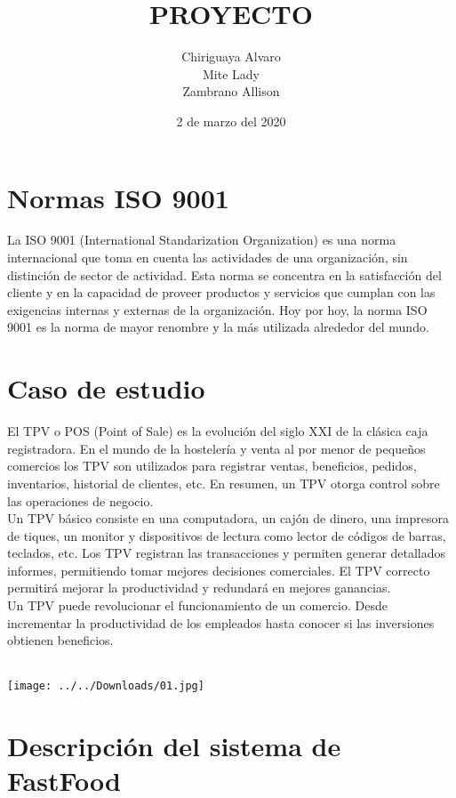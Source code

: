 \documentclass[12pt,a4paper]{article}
\title{PROYECTO}
\author{Chiriguaya Alvaro\\Mite Lady\\Zambrano Allison}
\date{2 de marzo del 2020}
\begin{document}
\maketitle

\section{Normas ISO 9001}
La ISO 9001 (International Standarization Organization) es una norma internacional que toma en cuenta las actividades de una organización, sin distinción de sector de actividad. Esta norma se concentra en la satisfacción del cliente y en la capacidad de proveer productos y servicios que cumplan con las exigencias internas y externas de la organización. Hoy por hoy, la norma ISO 9001 es la norma de mayor renombre y la más utilizada alrededor del mundo.

\section{Caso de estudio}
El TPV o POS (Point of Sale) es la evolución del siglo XXI de la clásica caja registradora. En el mundo de la hostelería y venta al por menor de pequeños comercios los TPV son utilizados para registrar ventas, beneficios, pedidos, inventarios, historial de clientes, etc. En resumen, un TPV otorga control sobre las operaciones de negocio.\\
Un TPV básico consiste en una computadora, un cajón de dinero, una impresora de tiques, un monitor y dispositivos de lectura como lector de códigos de barras, teclados, etc. Los TPV registran las transacciones y permiten generar detallados informes, permitiendo tomar mejores decisiones comerciales. El TPV correcto permitirá mejorar la productividad y redundará en mejores ganancias.\\
Un TPV puede revolucionar el funcionamiento de un comercio. Desde incrementar la productividad de los empleados hasta conocer si las inversiones obtienen beneficios.\\\\
\begin{center}
\texttt{[image: ../../Downloads/01.jpg]} 
\end{center}

\section{Descripción del sistema de FastFood}
\end{document}

